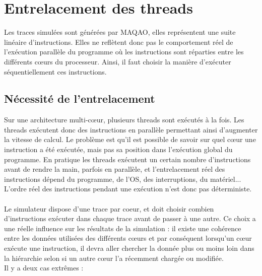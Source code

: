 \section{Entrelacement des threads}

Les traces simulées sont générées par \textsf{MAQAO}, elles représentent une suite linéaire d'instructions. Elles ne reflètent donc pas le comportement réel de l'exécution parallèle du programme où les instructions sont réparties entre les différents c\oe urs du processeur. Ainsi, il faut choisir la manière d'exécuter séquentiellement ces instructions.

\subsection{Nécessité de l'entrelacement}

Sur une architecture multi-c{\oe}ur, plusieurs threads sont exécutés à la fois. Les threads exécutent donc des instructions en parallèle permettant ainsi d'augmenter la vitesse de calcul. Le problème est qu'il est possible de savoir sur quel c\oe ur une instruction a été exécutée, mais pas sa position dans l'exécution global du programme. En pratique les threads exécutent un certain nombre d'instructions avant de rendre la main, parfois en parallèle, et l'entrelacement réel des instructions dépend du programme, de l'OS, des interruptions, du matériel... L'ordre réel des instructions pendant une exécution n'est donc pas déterministe.

\paragraph{}
Le simulateur dispose d'une trace par coeur, et doit choisir combien d'instructions exécuter dans chaque trace avant de passer à une autre. Ce choix a une réelle influence sur les résultats de la simulation : il existe une cohérence entre les données utilisées des différents c\oe urs et par conséquent lorsqu'un c\oe ur exécute une instruction, il devra aller chercher la donnée plus ou moins loin dans la hiérarchie selon si un autre c\oe ur l'a récemment chargée ou modifiée. \\

Il y a deux cas extrêmes :

